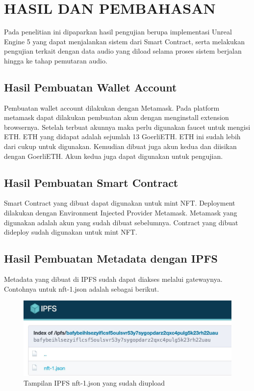 \chapter{HASIL DAN PEMBAHASAN}
\label{chap:hasildanpembahasan}



Pada penelitian ini dipaparkan hasil pengujian berupa implementasi Unreal Engine 5 yang dapat menjalankan sistem dari Smart Contract, serta melakukan pengujian terkait
dengan data audio yang diload selama proses sistem berjalan hingga ke tahap pemutaran audio.

\section{Hasil Pembuatan Wallet Account}
Pembuatan wallet account dilakukan dengan Metamask. Pada platform metamask dapat dilakukan pembuatan akun dengan menginstall extension browsernya. Setelah terbuat akunnya maka perlu
digunakan faucet untuk mengisi ETH. ETH yang didapat adalah sejumlah 13 GoerliETH. ETH ini sudah lebih dari cukup untuk digunakan. Kemudian dibuat juga akun kedua dan diisikan dengan GoerliETH.
Akun kedua juga dapat digunakan untuk pengujian.

\section{Hasil Pembuatan Smart Contract}
Smart Contract yang dibuat dapat digunakan untuk mint NFT. Deployment dilakukan dengan Environment Injected Provider Metamask.
Metamask yang digunakan adalah akun yang sudah dibuat sebelumnya. Contract yang dibuat dideploy sudah digunakan untuk mint NFT.

\section{Hasil Pembuatan Metadata dengan IPFS}
Metadata yang dibuat di IPFS sudah dapat diakses melalui gatewaynya. Contohnya untuk nft-1.json adalah sebagai berikut.

\begin{figure}[H]
  \centering

  \includegraphics[scale=0.3]{gambar/nftjsonuploaded.jpg}

  \caption{Tampilan IPFS nft-1.json yang sudah diupload}
  \label{fig:ipfsjsonuploaded}
\end{figure}

